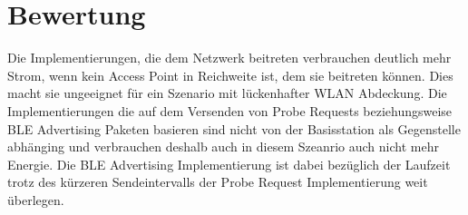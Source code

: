 \section{Bewertung}
Die Implementierungen, die dem Netzwerk beitreten verbrauchen deutlich mehr Strom, wenn kein Access Point in Reichweite ist, dem sie beitreten können.
Dies macht sie ungeeignet für ein Szenario mit lückenhafter WLAN Abdeckung.
Die Implementierungen die auf dem Versenden von Probe Requests beziehungsweise BLE Advertising Paketen basieren sind nicht von der Basisstation als Gegenstelle abhänging und verbrauchen deshalb auch in diesem Szeanrio auch nicht mehr Energie.
Die BLE Advertising Implementierung ist dabei bezüglich der Laufzeit trotz des kürzeren Sendeintervalls der Probe Request Implementierung weit überlegen.
